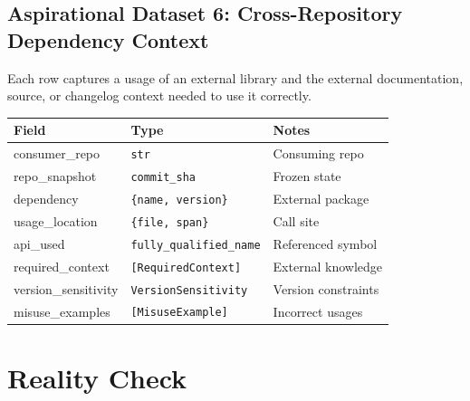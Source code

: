\documentclass[a4paper,12pt]{article}
\begin{document}
\subsection*{Aspirational Dataset 6: Cross-Repository Dependency Context}

\noindent Each row captures a usage of an external library and the external documentation, source, or changelog context needed to use it correctly.

\begin{tcolorbox}[title=DependencyUsage]
\footnotesize
\begin{tabularx}{\linewidth}{@{} l l Y @{}}
\toprule
\textbf{Field} & \textbf{Type} & \textbf{Notes} \\
\midrule
consumer\_repo & \texttt{str} & Consuming repo \\
repo\_snapshot & \texttt{commit\_sha} & Frozen state \\
dependency & \texttt{\{name, version\}} & External package \\
usage\_location & \texttt{\{file, span\}} & Call site \\
api\_used & \texttt{fully\_qualified\_name} & Referenced symbol \\
required\_context & \texttt{[RequiredContext]} & External knowledge \\
version\_sensitivity & \texttt{VersionSensitivity} & Version constraints \\
misuse\_examples & \texttt{[MisuseExample]} & Incorrect usages \\
\bottomrule
\end{tabularx}
\end{tcolorbox}

%
%
%
%
%
\newpage
\section{Reality Check}

\end{document}
